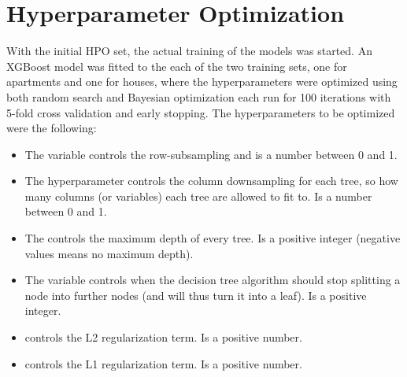 \FloatBarrier
\section{Hyperparameter Optimization}
\label{sec:h:hyperparamater_optimization}
With the initial HPO set, the actual training of the models was started. An XGBoost model was fitted to the each of the two training sets, one for apartments and one for houses, where the hyperparameters were optimized using both random search and Bayesian optimization each run for \num{100} iterations with \num{5}-fold cross validation and early stopping. The hyperparameters to be optimized were the following:
\begin{itemize}
  \item[] The  variable controls the row-subsampling and is a number between \num{0} and \num{1}. 
  \item[] The hyperparameter  controls the column downsampling for each tree, so how many columns (or variables) each tree are allowed to fit to. Is a number between \num{0} and \num{1}.
  \item[] The  controls the maximum depth of every tree. Is a positive integer (negative values means no maximum depth).  
  \item[] The  variable controls when the decision tree algorithm should stop splitting a node into further nodes (and will thus turn it into a leaf). Is a positive integer.
  \item[]  controls the L2 regularization term. Is a positive number. 
  \item[]  controls the L1 regularization term. Is a positive number.
\end{itemize}

